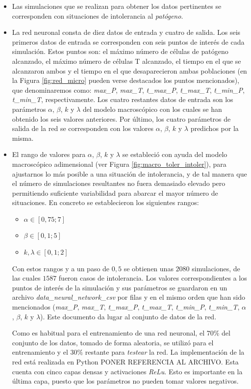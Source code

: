 \begin{itemize}
	\item Las simulaciones que se realizan para obtener los datos pertinentes se corresponden con situaciones de intolerancia al \textit{patógeno}.
	
	\item La red neuronal consta de diez datos de entrada y cuatro de salida. Los seis primeros datos de entrada se corresponden con seis puntos de interés de cada simulación. Estos puntos son: el máximo número de células de patógeno alcanzado, el máximo número de células T alcanzado, el tiempo en el que se alcanzaron ambos y el tiempo en el que desaparecieron ambas poblaciones (en la Figura \ref{fig:red_micro} pueden verse destacados los puntos mencionados), que denominaremos como: \textit{max\_P}, \textit{max\_T}, \textit{t\_max\_P}, \textit{t\_max\_T}, \textit{t\_min\_P}, \textit{t\_min\_T}, respectivamente. Los cuatro restantes datos de entrada son los parámetros $\alpha$, $\beta$, $k$ y $\lambda$ del modelo macroscópico con los cuales se han obtenido los seis valores anteriores. Por último, los cuatro parámetros de salida de la red se corresponden con los valores $\alpha$, $\beta$, $k$ y $\lambda$ predichos por la misma.
	
	\item El rango de valores para $\alpha$, $\beta$, $k$ y $\lambda$ se estableció con ayuda del modelo macroscópico adimensional (ver Figura \ref{fig:macro_toler_intoler}), para ajustarnos lo más posible a una situación de intolerancia, y de tal manera que el número de simulaciones resultantes no fuera demasiado elevado pero permitiendo suficiente variabilidad para abarcar el mayor número de situaciones. En concreto se establecieron los siguientes rangos:
	
	\begin{itemize}
		\item $\alpha \in  [0,75;7]$
		\item $\beta \in [0,1;5]$
		\item $k, \lambda \in [0,1;2]$
	\end{itemize}
	
	Con estos rangos y a un paso de $0,5$ se obtienen unas $2080$ simulaciones, de las cuales $1587$ fueron casos de intolerancia. Los valores correspondientes a los puntos de interés de la simulación y sus parámetros se guardaron en un archivo \textit{data\_neural\_network\_csv} por filas y en el mismo orden que han sido mencionados (\textit{max\_P}, \textit{max\_T}, \textit{t\_max\_P}, \textit{t\_max\_T}, \textit{t\_min\_P}, \textit{t\_min\_T}, $\alpha$, $\beta$, $k$ y $\lambda$). Este documento da lugar al conjunto de datos de la red.
	
	Como es habitual para el entrenamiento de una red neuronal, el $70\%$ del conjunto de los datos, tomado de forma aleatoria, se utilizó para el entrenamiento y el $30\%$ restante para \textit{testear} la red. La implementación de la red está realizada en Python PONER REFERENCIA AL ARCHIVO. Esta cuenta con cinco capas densas y activaciones \textit{ReLu}. Esto es importante en la última capa, puesto que los parámetros no pueden tomar valores negativos.
	
\end{itemize}


